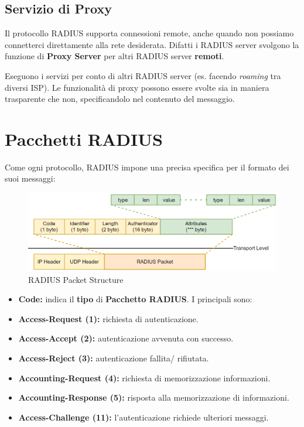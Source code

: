 \subsection{Servizio di Proxy}
Il protocollo RADIUS supporta connessioni remote, anche quando non possiamo connetterci direttamente alla rete desiderata. Difatti i RADIUS server svolgono la funzione di \textbf{Proxy Server} per altri RADIUS server \textbf{remoti}.
\begin{theorem}
 Eseguono i servizi per conto di altri RADIUS server (es. facendo \textit{roaming} tra diversi ISP). Le funzionalità di proxy possono essere svolte sia in maniera trasparente che non, specificandolo nel contenuto del messaggio.
\end{theorem}\pagebreak
\section{Pacchetti RADIUS}
Come ogni protocollo, RADIUS impone una precisa specifica per il formato dei suoi messaggi:
\begin{figure}[h]
    \centering
    \includegraphics{image/radpack.png}
    \caption{RADIUS Packet Structure}
    \label{fig:radpack}
\end{figure}
\begin{itemize}
    \item \textbf{Code:} indica il \textbf{tipo} di \textbf{Pacchetto RADIUS}. I principali sono:
\end{itemize}
        \begin{definition}
        \begin{itemize}
            \item \textbf{Access-Request (1):} richiesta di autenticazione.
            \item \textbf{Access-Accept (2):} autenticazione avvenuta con successo.
            \item \textbf{Access-Reject (3):} autenticazione fallita/ rifiutata.
            \item \textbf{Accounting-Request (4):} richiesta di memorizzazione informazioni.
            \item \textbf{Accounting-Response (5):} risposta alla memorizzazione di informazioni.
            \item \textbf{Access-Challenge (11):} l'autenticazione richiede ulteriori messaggi.
        \end{itemize}
        \end{definition}
